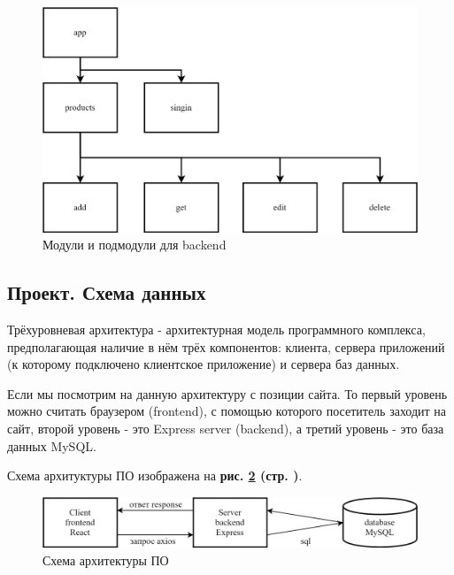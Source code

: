 \begin{figure}[!htp]
    \centering
    \includegraphics[width=16cm]
        {_assets/gpi_backend_modules.png}
    \caption{Модули и подмодули для backend}
    \label{fig:gpi_backend_modules}
\end{figure}

\newpage

\subsection{Проект. Схема данных}

Трёхуровневая архитектура - архитектурная модель программного комплекса,
предполагающая наличие в нём трёх компонентов: клиента, сервера приложений
(к которому подключено клиентское приложение) и сервера баз данных.

Если мы посмотрим на данную архитектуру с позиции сайта.
То первый уровень можно считать браузером (frontend), с помощью которого посетитель заходит на сайт,
второй уровень - это Express server (backend), а третий уровень - это база данных MySQL.

Схема архитуктуры ПО изображена на
\textbf{рис. \ref{fig:gpi_client_server} (стр. \pageref{fig:gpi_client_server})}.

\begin{figure}[!htp]
    \centering
    \includegraphics[width=16cm]
        {_assets/gpi_client_server.png}
    \caption{Схема архитектуры ПО}
    \label{fig:gpi_client_server}
\end{figure}

